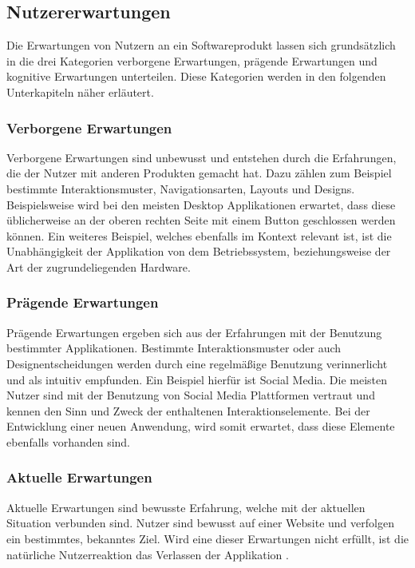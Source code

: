 \subsection{Nutzererwartungen}
Die Erwartungen von Nutzern an ein Softwareprodukt lassen sich grundsätzlich in die drei Kategorien verborgene Erwartungen, prägende Erwartungen und kognitive Erwartungen unterteilen.
Diese Kategorien werden in den folgenden Unterkapiteln näher erläutert.

\subsubsection{Verborgene Erwartungen}
Verborgene Erwartungen sind unbewusst und entstehen durch die Erfahrungen, die der Nutzer mit anderen Produkten gemacht hat.
Dazu zählen zum Beispiel bestimmte Interaktionsmuster, Navigationsarten, Layouts und Designs.
Beispielsweise wird bei den meisten Desktop Applikationen erwartet, dass diese üblicherweise an der oberen rechten Seite mit einem Button geschlossen werden können.
Ein weiteres Beispiel, welches ebenfalls im Kontext  relevant ist, ist die Unabhängigkeit der Applikation von dem Betriebssystem, beziehungsweise der Art der zugrundeliegenden Hardware.

\subsubsection{Prägende Erwartungen}
Prägende Erwartungen ergeben sich aus der Erfahrungen mit der Benutzung bestimmter Applikationen.
Bestimmte Interaktionsmuster oder auch Designentscheidungen werden durch eine regelmäßige Benutzung verinnerlicht und als intuitiv empfunden.
Ein Beispiel hierfür ist Social Media.
Die meisten Nutzer sind mit der Benutzung von Social Media Plattformen vertraut und kennen den Sinn und Zweck der enthaltenen Interaktionselemente.
Bei der Entwicklung einer neuen Anwendung, wird somit erwartet, dass diese Elemente ebenfalls vorhanden sind.

\subsubsection{Aktuelle Erwartungen}
Aktuelle Erwartungen sind bewusste Erfahrung, welche mit der aktuellen Situation verbunden sind.
Nutzer sind bewusst auf einer Website und verfolgen ein bestimmtes, bekanntes Ziel.
Wird eine dieser Erwartungen nicht erfüllt, ist die natürliche Nutzerreaktion das Verlassen der Applikation \autocite[vgl.][S. ]{noauthor_user_nodate}.

